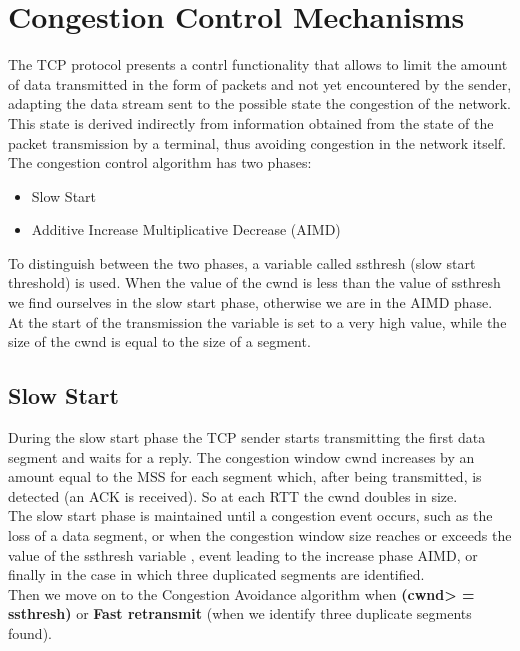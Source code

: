 \section{\normalsize Congestion Control Mechanisms}{
The TCP protocol presents a contrl functionality that allows to limit the amount of data transmitted in the form of packets and not yet encountered by the sender, adapting the data stream sent to the possible state the congestion of the network. This state is derived indirectly from information obtained from the state of the packet transmission by a terminal, thus avoiding congestion in the network itself.\\
The congestion control algorithm has two phases:
\begin{itemize}
	\item  Slow Start 
	\item Additive Increase Multiplicative Decrease (AIMD)
\end{itemize}
To distinguish between the two phases, a variable called ssthresh (slow start threshold) is used. When the value of the cwnd is less than the value of ssthresh we find ourselves in the slow start phase, otherwise we are in the AIMD phase. At the start of the transmission the variable is set to a very high value, while the size of the cwnd is equal to the size of a segment.
\subsection{\normalsize Slow Start}{
During the slow start phase the TCP sender starts transmitting the first data segment and waits for a reply. The congestion window cwnd increases by an amount equal to the MSS for each segment which, after being transmitted, is detected (an ACK is received). So at each RTT the cwnd doubles in size.\\
The slow start phase is maintained until a congestion event occurs, such as the loss of a data segment, or when the congestion window size reaches or exceeds the value of the ssthresh variable , event leading to the increase phase AIMD, or finally in the case in which three duplicated segments are identified.\\
Then we move on to the Congestion Avoidance algorithm when \textbf{(cwnd> = ssthresh)} or \textbf{ Fast retransmit} (when we identify three duplicate segments found).}
}
